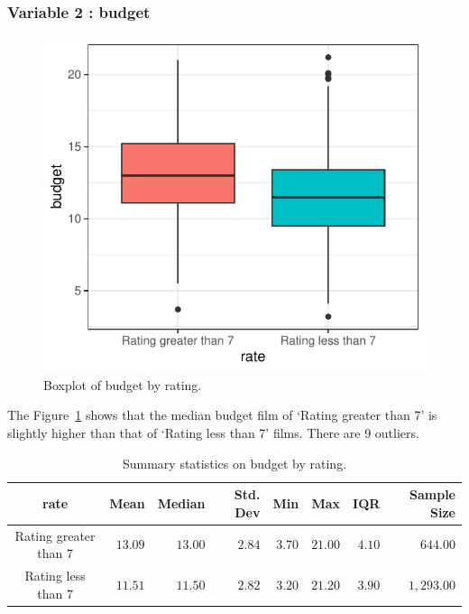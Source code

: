 \documentclass[
  letterpaper,
  DIV=11,
  numbers=noendperiod]{scrartcl}
\begin{document}
\clearpage

\hypertarget{variable-2-budget}{%
\subsubsection{Variable 2 : budget}\label{variable-2-budget}}

\begin{figure}

{\centering \includegraphics{Group_06_Analysis_files/figure-pdf/fig-boxplot-budget-1.pdf}

}

\caption{\label{fig-boxplot-budget}Boxplot of budget by rating.}

\end{figure}

The Figure~\ref{fig-boxplot-budget} shows that the median budget film of
`Rating greater than 7' is slightly higher than that of `Rating less
than 7' films. There are 9 outliers.

\hypertarget{tbl-summary-budget}{}
\begin{longtable}{crrrrrrr}
\caption{\label{tbl-summary-budget}Summary statistics on budget by rating. }\tabularnewline

\toprule
rate & Mean & Median & Std. Dev & Min & Max & IQR & Sample Size \\ 
\midrule\addlinespace[2.5pt]
Rating greater than 7 & $13.09$ & $13.00$ & $2.84$ & $3.70$ & $21.00$ & $4.10$ & $644.00$ \\ 
Rating less than 7 & $11.51$ & $11.50$ & $2.82$ & $3.20$ & $21.20$ & $3.90$ & $1,293.00$ \\ 
\bottomrule
\end{longtable}
\end{document}
